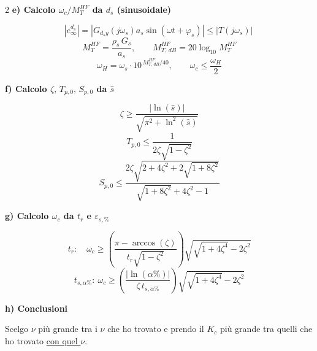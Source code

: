 \documentclass[10pt,a4paper]{article}
\newcommand{\sub}[1]{\smallskip\noindent\textbf{#1}\par\nobreak}
\begin{document}
\begin{center}
{{\begin{multicols}{2}
\sub{e) Calcolo $\omega_c/M_T^{HF}$ da $d_s$ (sinusoidale)}
\[
|e_{\infty}^{d_s}| = \left|G_{d_s y}(j\omega_s) a_s \sin(\omega t + \varphi_s)\right|
\leq |T(j\omega_s)|\
\]
\[
M_T^{HF}=\frac{\rho_s\,G_s}{a_s},\qquad M_{T,\,dB}^{HF}=20\log_{10}M_T^{HF}
\]
\[
\omega_H=\omega_s\cdot 10^{\,M_{T,\,dB}^{HF}/40},\qquad \omega_c\leq\frac{\omega_H}{2}
\]

\sub{f) Calcolo $\zeta,\,T_{p,0},\,S_{p,0}$ da $\hat{s}$}
\[
\zeta\ge\frac{|\ln(\hat{s})|}{\sqrt{\pi^{2}+\ln^{2}(\hat{s})}}
\]
\[
T_{p,0}\leq\frac{1}{2\zeta\sqrt{1-\zeta^{2}}}
\]
\[
S_{p,0}\leq\frac{2\zeta\sqrt{2+4\zeta^{2}+2\sqrt{1+8\zeta^{2}}}}{\sqrt{1+8\zeta^{2}}+4\zeta^{2}-1}
\]

\sub{g) Calcolo $\omega_c$ da $t_r$ e $\varepsilon_{s,\%}$}
\[
t_r:\quad \omega_c\geq\left(\frac{\pi-\arccos(\zeta)}{t_r\sqrt{1-\zeta^{2}}}\right)\sqrt{\sqrt{1+4\zeta^{4}}-2\zeta^{2}}
\]
\[
t_{s,\alpha\%}:\ \omega_c\geq\left(\frac{|\ln(\alpha\%)|}{\zeta\,t_{s,\alpha\%}}\right)\sqrt{\sqrt{1+4\zeta^{4}}-2\zeta^{2}}
\]

\sub{h) Conclusioni}
Scelgo $\nu$ più grande tra i $\nu$ che ho trovato e prendo il $K_c$ più grande tra quelli che ho trovato \underline{con quel $\nu$}.
\end{multicols}
}}
\end{center}

\vspace{-1.5mm} %
\end{document}
